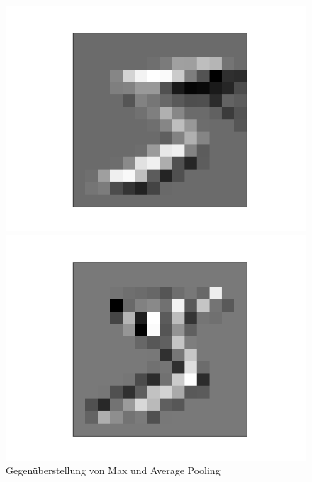 \documentclass{article}
\begin{document}
\begin{figure}[h]
\begin{minipage}{0.2\linewidth}
	\includegraphics[width=\linewidth]{../graphics/mnist_5/conv_pool/lower_horiz_avgpooled.png}
\end{minipage}
\hfill
\begin{minipage}{0.2\linewidth}
	\centering
	\includegraphics[width=\linewidth]{../graphics/mnist_5/conv_pool/right_vert_avgpooled.png}
\end{minipage}
\caption{Gegenüberstellung von Max und Average Pooling}
\label{Pooling_Mnist}
\end{figure}
\\
\end{document}
